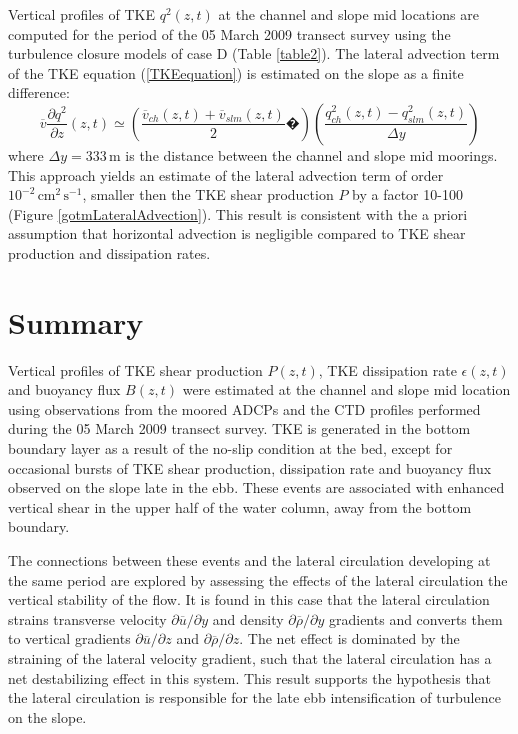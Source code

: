 Vertical profiles of TKE $q^2(z,t)$ at the channel and slope mid locations are computed for the period of the 05 March 2009 transect survey using the turbulence closure models of case D (Table \ref{table2}). The lateral advection term of the TKE equation (\ref{TKEequation}) is estimated on the slope as a finite difference:
\begin{equation}
\overline{v} \frac{\partial q^2}{\partial z}(z,t) \simeq \left( \frac{\overline{v}_{ch}(z,t) + \overline{v}_{slm}(z,t)}{2}�\right) \left( \frac{q^2_{ch}(z,t) - q^2_{slm}(z,t)}{\Delta y}      \right)
\end{equation}
where $\Delta y = 333\, \mathrm{m}$ is the distance between the channel and slope mid moorings. This approach yields an estimate of the lateral advection term of order $10^{-2}\,\mathrm{cm^2\,s^{-1}}$, smaller then the TKE shear production $P$ by a factor 10-100 (Figure \ref{gotmLateralAdvection}). This result is consistent with the a priori assumption that horizontal advection is negligible compared to TKE shear production and dissipation rates.

\section{Summary}

Vertical profiles of TKE shear production $P(z,t)$, TKE dissipation rate $\epsilon(z,t)$ and buoyancy flux $B(z,t)$ were estimated at the channel and slope mid location using observations from the moored ADCPs and the CTD profiles performed during the 05 March 2009 transect survey. TKE is generated in the bottom boundary layer as a result of the no-slip condition at the bed, except for occasional bursts of TKE shear production, dissipation rate and buoyancy flux observed on the slope late in the ebb. These events are associated with enhanced vertical shear in the upper half of the water column, away from the bottom boundary. 

The connections between these events and the lateral circulation developing at the same period are explored by assessing the effects of the lateral circulation the vertical stability of the flow. It is found in this case that the lateral circulation strains transverse velocity $\partial \overline{u} / \partial y$ and density $\partial \overline{\rho} / \partial y$  gradients and converts them to vertical gradients $\partial \overline{u} / \partial z$ and $\partial \overline{\rho} / \partial z$. The net effect is dominated by the straining of the lateral velocity gradient, such that the lateral circulation has a net destabilizing effect in this system. This result supports the hypothesis that the lateral circulation is responsible for the late ebb intensification of turbulence on the slope. 

